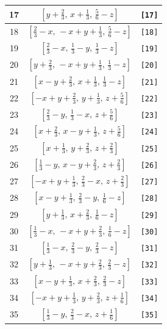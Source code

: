 \documentclass[fleqn,8pt]{jsarticle}
\begin{document}
\begin{longtable}{ccc}
17 & $\left[ y + \frac{2}{3},\, x + \frac{1}{3},\, \frac{5}{6} - z \right]$ & {\tt [17]} \\ \hline
18 & $\left[ \frac{2}{3} - x,\, - x + y + \frac{1}{3},\, \frac{5}{6} - z \right]$ & {\tt [18]} \\ \hline
19 & $\left[ \frac{2}{3} - x,\, \frac{1}{3} - y,\, \frac{1}{3} - z \right]$ & {\tt [19]} \\ \hline
20 & $\left[ y + \frac{2}{3},\, - x + y + \frac{1}{3},\, \frac{1}{3} - z \right]$ & {\tt [20]} \\ \hline
21 & $\left[ x - y + \frac{2}{3},\, x + \frac{1}{3},\, \frac{1}{3} - z \right]$ & {\tt [21]} \\ \hline
22 & $\left[ - x + y + \frac{2}{3},\, y + \frac{1}{3},\, z + \frac{5}{6} \right]$ & {\tt [22]} \\ \hline
23 & $\left[ \frac{2}{3} - y,\, \frac{1}{3} - x,\, z + \frac{5}{6} \right]$ & {\tt [23]} \\ \hline
24 & $\left[ x + \frac{2}{3},\, x - y + \frac{1}{3},\, z + \frac{5}{6} \right]$ & {\tt [24]} \\ \hline
25 & $\left[ x + \frac{1}{3},\, y + \frac{2}{3},\, z + \frac{2}{3} \right]$ & {\tt [25]} \\ \hline
26 & $\left[ \frac{1}{3} - y,\, x - y + \frac{2}{3},\, z + \frac{2}{3} \right]$ & {\tt [26]} \\ \hline
27 & $\left[ - x + y + \frac{1}{3},\, \frac{2}{3} - x,\, z + \frac{2}{3} \right]$ & {\tt [27]} \\ \hline
28 & $\left[ x - y + \frac{1}{3},\, \frac{2}{3} - y,\, \frac{1}{6} - z \right]$ & {\tt [28]} \\ \hline
29 & $\left[ y + \frac{1}{3},\, x + \frac{2}{3},\, \frac{1}{6} - z \right]$ & {\tt [29]} \\ \hline
30 & $\left[ \frac{1}{3} - x,\, - x + y + \frac{2}{3},\, \frac{1}{6} - z \right]$ & {\tt [30]} \\ \hline
31 & $\left[ \frac{1}{3} - x,\, \frac{2}{3} - y,\, \frac{2}{3} - z \right]$ & {\tt [31]} \\ \hline
32 & $\left[ y + \frac{1}{3},\, - x + y + \frac{2}{3},\, \frac{2}{3} - z \right]$ & {\tt [32]} \\ \hline
33 & $\left[ x - y + \frac{1}{3},\, x + \frac{2}{3},\, \frac{2}{3} - z \right]$ & {\tt [33]} \\ \hline
34 & $\left[ - x + y + \frac{1}{3},\, y + \frac{2}{3},\, z + \frac{1}{6} \right]$ & {\tt [34]} \\ \hline
35 & $\left[ \frac{1}{3} - y,\, \frac{2}{3} - x,\, z + \frac{1}{6} \right]$ & {\tt [35]} \\ \hline

\end{longtable}
\end{document}
